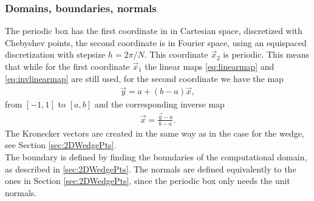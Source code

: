 \subsubsection*{Domains, boundaries, normals}
The periodic box has the first coordinate in in Cartesian space, discretized with Chebyshev points, the second coordinate is in Fourier space, using an equispaced discretization with stepsize $h = 2\pi /N$. This coordinate $\vec x_2$ is periodic. 
This means that while for the first coordinate $\vec x_1$ the linear maps \eqref{eq:linearmap} and \eqref{eq:invlinearmap} are still used, for the second coordinate we have the map 
\begin{align*}
	\vec y = a + (b-a) \vec x, 
\end{align*}
from $[-1,1]$ to $[a,b]$ and the corresponding inverse map
\begin{align*}
   \vec x = \frac{\vec y- a}{b-a}.
\end{align*}
The Kronecker vectors are created in the same way as in the case for the wedge, see Section \ref{sec:2DWedgePts}.
\\
The boundary is defined by finding the boundaries of the computational domain, as described in \ref{sec:2DWedgePts}. The normals are defined equivalently to the ones in Section \ref{sec:2DWedgePts}, since the periodic box only needs the unit normals.

